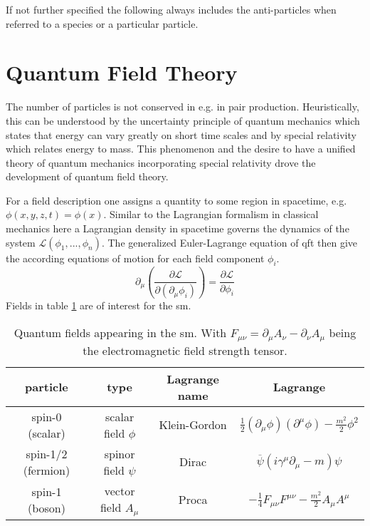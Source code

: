 If not further specified the following always includes the anti-particles when referred to a species or a particular particle.

\section{Quantum Field Theory}
The number of particles is not conserved in e.g. in pair production. Heuristically, this can be understood by the uncertainty principle of quantum mechanics which states that energy can vary greatly on short time scales and by special relativity which relates energy to mass. This phenomenon and the desire to have a unified theory of quantum mechanics incorporating special relativity drove the development of quantum field theory. 

For a field description one assigns a quantity to some region in spacetime, e.g. $\phi(x,y,z,t)=\phi(x)$. Similar to the Lagrangian formalism in classical mechanics here a Lagrangian density in spacetime governs the dynamics of the system $\mathcal{L}(\phi_1,...,\phi_n)$. The generalized Euler-Lagrange equation of qft then give the according equations of motion for each field component $\phi_i$.
\begin{equation}
    \partial_\mu \left(\frac{\partial\mathcal{L}}{\partial(\partial_\mu\phi_i)}\right)=\frac{\partial\mathcal{L}}{\partial \phi_i}
\end{equation}
Fields in table \ref{tab:fields} are of interest for the \ac{sm}.
\begin{table}
    \begin{center}
    \begin{tabular}{c|c|c|c} 
     particle  & type & Lagrange name & Lagrange \\ [1ex]  \hline
     spin-0 (scalar)& scalar field $\phi$ & Klein-Gordon & $\frac{1}{2} (\partial_\mu \phi )(\partial^\mu \phi)-\frac{m^2}{2}\phi^2 $\\  [1ex] 
     spin-1/2 (fermion)  & spinor field $\psi$& Dirac & $ \overline{\psi}(i \gamma^\mu \partial_\mu - m )\psi$ \\  [1ex] 
     spin-1 (boson) & vector field  $A_\mu$ & Proca & $-\frac{1}{4}F_{\mu\nu}F^{\mu\nu} -\frac{m^2}{2} A_\mu A^\mu$ \\  [2ex] 

    \end{tabular}        
    \caption{Quantum fields appearing in the \ac{sm}. With $F_{\mu\nu}=\partial_\mu A_\nu - \partial_\nu A_\mu$ being the electromagnetic field strength tensor.}
    \label{tab:fields}
\end{center} 
\end{table}

